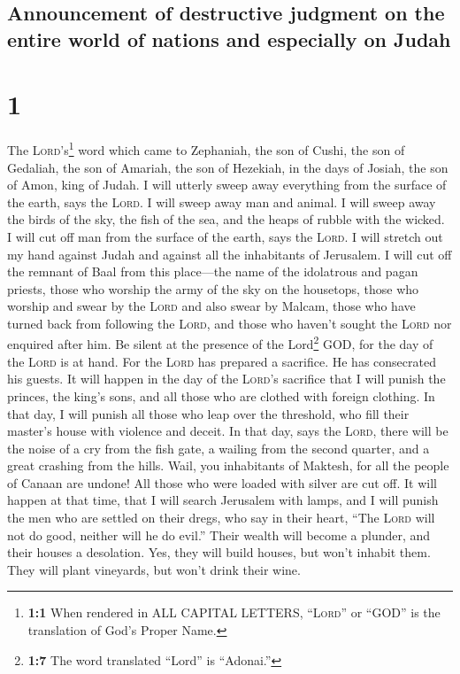\hypertarget{announcement-of-destructive-judgment-on-the-entire-world-of-nations-and-especially-on-judah}{%
\subsection{Announcement of destructive judgment on the entire world of
nations and especially on
Judah}\label{announcement-of-destructive-judgment-on-the-entire-world-of-nations-and-especially-on-judah}}

\hypertarget{section}{%
\section{1}\label{section}}

 The \textsc{Lord}'s\footnote{\textbf{1:1} When rendered
  in ALL CAPITAL LETTERS, ``\textsc{Lord}'' or ``GOD'' is the
  translation of God's Proper Name.} word which came to Zephaniah, the
son of Cushi, the son of Gedaliah, the son of Amariah, the son of
Hezekiah, in the days of Josiah, the son of Amon, king of Judah.
 I will utterly sweep away everything from the surface of
the earth, says the \textsc{Lord}.  I will sweep away man
and animal. I will sweep away the birds of the sky, the fish of the sea,
and the heaps of rubble with the wicked. I will cut off man from the
surface of the earth, says the \textsc{Lord}.  I will
stretch out my hand against Judah and against all the inhabitants of
Jerusalem. I will cut off the remnant of Baal from this place---the name
of the idolatrous and pagan priests,  those who worship
the army of the sky on the housetops, those who worship and swear by the
\textsc{Lord} and also swear by Malcam,  those who have
turned back from following the \textsc{Lord}, and those who haven't
sought the \textsc{Lord} nor enquired after him.  Be
silent at the presence of the Lord\footnote{\textbf{1:7} The word
  translated ``Lord'' is ``Adonai.''} GOD, for the day of the
\textsc{Lord} is at hand. For the \textsc{Lord} has prepared a
sacrifice. He has consecrated his guests.  It will happen
in the day of the \textsc{Lord}'s sacrifice that I will punish the
princes, the king's sons, and all those who are clothed with foreign
clothing.  In that day, I will punish all those who leap
over the threshold, who fill their master's house with violence and
deceit.  In that day, says the \textsc{Lord}, there will
be the noise of a cry from the fish gate, a wailing from the second
quarter, and a great crashing from the hills.  Wail, you
inhabitants of Maktesh, for all the people of Canaan are undone! All
those who were loaded with silver are cut off.  It will
happen at that time, that I will search Jerusalem with lamps, and I will
punish the men who are settled on their dregs, who say in their heart,
``The \textsc{Lord} will not do good, neither will he do evil.''
 Their wealth will become a plunder, and their houses a
desolation. Yes, they will build houses, but won't inhabit them. They
will plant vineyards, but won't drink their wine.


